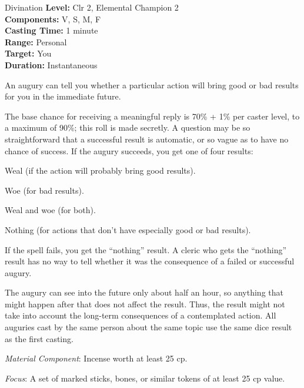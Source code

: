 {Divination}
{
	\textbf{Level:}
	Clr 2, Elemental Champion 2\\
	\textbf{Components:}
	V, S, M, F\\
	\textbf{Casting Time:}
	1 minute\\
	\textbf{Range:}
	Personal\\
	\textbf{Target:}
	You\\
	\textbf{Duration:}
	Instantaneous\\
}
{
	An augury can tell you whether a particular action will bring good or bad results for you in the immediate future.

	The base chance for receiving a meaningful reply is 70\% + 1\% per caster level, to a maximum of 90\%; this roll is made secretly. A question may be so straightforward that a successful result is automatic, or so vague as to have no chance of success. If the augury succeeds, you get one of four results:

\begin{itemize*}
\item Weal (if the action will probably bring good results).
\item Woe (for bad results).
\item Weal and woe (for both).
\item Nothing (for actions that don't have especially good or bad results).
\end{itemize*}

	If the spell fails, you get the ``nothing'' result. A cleric who gets the ``nothing'' result has no way to tell whether it was the consequence of a failed or successful augury.

	The augury can see into the future only about half an hour, so anything that might happen after that does not affect the result. Thus, the result might not take into account the long-term consequences of a contemplated action. All auguries cast by the same person about the same topic use the same dice result as the first casting.

	\textit{Material Component}:
	Incense worth at least 25 cp.

	\textit{Focus}:
	A set of marked sticks, bones, or similar tokens of at least 25 cp value.

}

